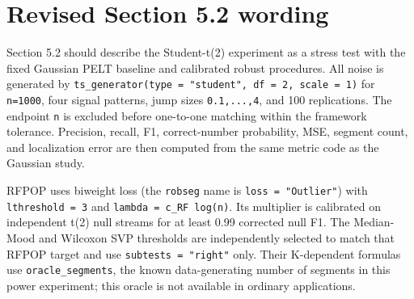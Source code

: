 \documentclass[
  10pt,
]{article}
\begin{document}
\section{Revised Section 5.2 wording}\label{revised-section-5.2-wording}

Section 5.2 should describe the Student-t(2) experiment as a stress test
with the fixed Gaussian PELT baseline and calibrated robust procedures.
All noise is generated by
\texttt{ts\_generator(type\ =\ "student",\ df\ =\ 2,\ scale\ =\ 1)} for
\texttt{n=1000}, four signal patterns, jump sizes \texttt{0.1,...,4},
and 100 replications. The endpoint \texttt{n} is excluded before
one-to-one matching within the framework tolerance. Precision, recall,
F1, correct-number probability, MSE, segment count, and localization
error are then computed from the same metric code as the Gaussian study.

RFPOP uses biweight loss (the \texttt{robseg} name is
\texttt{loss\ =\ "Outlier"}) with \texttt{lthreshold\ =\ 3} and
\texttt{lambda\ =\ c\_RF\ log(n)}. Its multiplier is calibrated on
independent t(2) null streams for at least 0.99 corrected null F1. The
Median-Mood and Wilcoxon SVP thresholds are independently selected to
match that RFPOP target and use \texttt{subtests\ =\ "right"} only.
Their K-dependent formulas use \texttt{oracle\_segments}, the known
data-generating number of segments in this power experiment; this oracle
is not available in ordinary applications.
\end{document}
